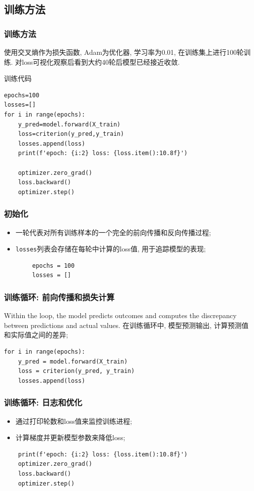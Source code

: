 \documentclass{beamer}
\begin{document}
\subsection{训练方法}
\begin{frame}[fragile]
	\frametitle{训练方法}
	使用交叉熵作为损失函数, Adam为优化器, 学习率为0.01, 在训练集上进行100轮训练. 对loss可视化观察后看到大约40轮后模型已经接近收敛.
	\begin{block}{训练代码}
		\begin{verbatim}
epochs=100
losses=[]
for i in range(epochs):
    y_pred=model.forward(X_train)
    loss=criterion(y_pred,y_train)
    losses.append(loss)
    print(f'epoch: {i:2} loss: {loss.item():10.8f}')
    
    optimizer.zero_grad()
    loss.backward()
    optimizer.step()
	\end{verbatim}
	\end{block}
\end{frame}

\begin{frame}[fragile]
	\frametitle{初始化}
	\begin{itemize}
		\item 一轮代表对所有训练样本的一个完全的前向传播和反向传播过程;
		\item \texttt{losses}列表会存储在每轮中计算的loss值, 用于追踪模型的表现;
	\end{itemize}
	\begin{verbatim}
		epochs = 100
		losses = []
		\end{verbatim}
\end{frame}

\begin{frame}[fragile]
	\frametitle{训练循环: 前向传播和损失计算}
	Within the loop, the model predicts outcomes and computes the discrepancy between predictions and actual values.
	在训练循环中, 模型预测输出, 计算预测值和实际值之间的差异;

	\begin{verbatim}
for i in range(epochs):
    y_pred = model.forward(X_train)
    loss = criterion(y_pred, y_train)
    losses.append(loss)
\end{verbatim}
\end{frame}

\begin{frame}[fragile]
	\frametitle{训练循环: 日志和优化}
	\begin{itemize}
		\item 通过打印轮数和loss值来监控训练进程;
		\item 计算梯度并更新模型参数来降低loss;
	\end{itemize}

	\begin{verbatim}
    print(f'epoch: {i:2} loss: {loss.item():10.8f}')
    optimizer.zero_grad()
    loss.backward()
    optimizer.step()
\end{verbatim}
\end{frame}
\end{document}
